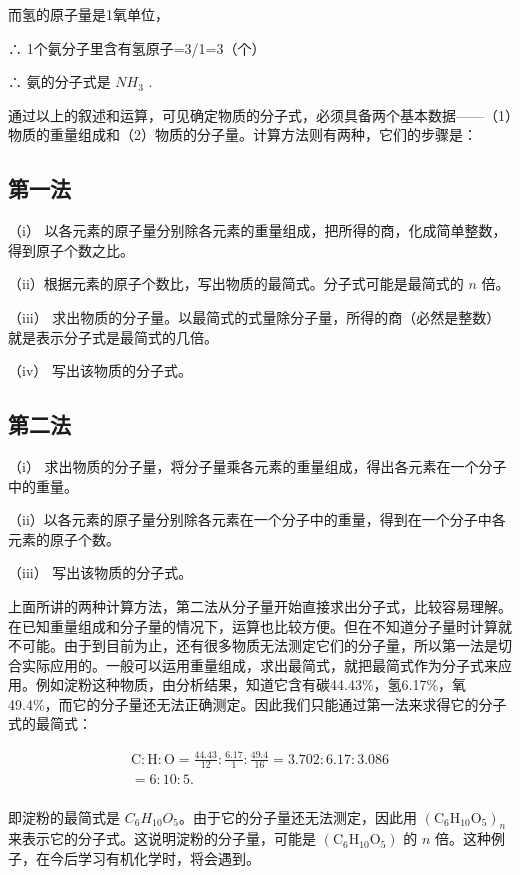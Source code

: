 而氢的原子量是1氧单位，

∴ 1个氨分子里含有氢原子=3/1=3（个）

∴ 氨的分子式是 \(NH_{3}\) .

通过以上的叙述和运算，可见确定物质的分子式，必须具备两个基本数据------（1）物质的重量组成和（2）物质的分子量。计算方法则有两种，它们的步骤是：

\subsection{第一法}

（i）
以各元素的原子量分别除各元素的重量组成，把所得的商，化成简单整数，得到原子个数之比。

（ii）根据元素的原子个数比，写出物质的最简式。分子式可能是最简式的 \(n\)
倍。

（iii）
求出物质的分子量。以最简式的式量除分子量，所得的商（必然是整数）就是表示分子式是最简式的几倍。

（iv） 写出该物质的分子式。

\subsection{第二法}

（i）
求出物质的分子量，将分子量乘各元素的重量组成，得出各元素在一个分子中的重量。

（ii）以各元素的原子量分别除各元素在一个分子中的重量，得到在一个分子中各元素的原子个数。

（iii） 写出该物质的分子式。

上面所讲的两种计算方法，第二法从分子量开始直接求出分子式，比较容易理解。在已知重量组成和分子量的情况下，运算也比较方便。但在不知道分子量时计算就不可能。由于到目前为止，还有很多物质无法测定它们的分子量，所以第一法是切合实际应用的。一般可以运用重量组成，求出最简式，就把最简式作为分子式来应用。例如淀粉这种物质，由分析结果，知道它含有碳44.43\%，氢6.17\%，氧49.4\%，而它的分子量还无法正确测定。因此我们只能通过第一法来求得它的分子式的最简式：

\[
\begin{array}{l} \mathrm{C}: \mathrm{H}: \mathrm{O} = \frac {44.43}{12}: \frac {6.17}{1}: \frac {49.4}{16} = 3.702: 6.17: 3.086 \\ = 6: 10: 5. \\ \end{array}
\]

即淀粉的最简式是 \(C_{6}H_{10}O_{5}\)。由于它的分子量还无法测定，因此用
\((\mathrm{C}_6\mathrm{H}_{10}\mathrm{O}_5)_n\)
来表示它的分子式。这说明淀粉的分子量，可能是
\((\mathrm{C}_6\mathrm{H}_{10}\mathrm{O}_5)\) 的 \(n\)
倍。这种例子，在今后学习有机化学时，将会遇到。

